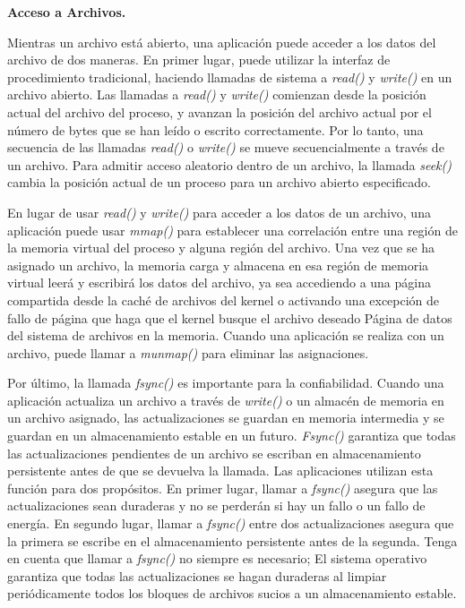 \documentclass[10pt]{book}
\begin{document}
\textbf{Acceso a Archivos.}

Mientras un archivo está abierto, una aplicación puede acceder a los datos del archivo de dos maneras. En primer lugar, puede utilizar la interfaz de procedimiento tradicional, haciendo llamadas de sistema a \textit{read()} y \textit{write()} en un archivo abierto. Las llamadas a \textit{read()} y \textit{write()} comienzan desde la posición actual del archivo del proceso, y avanzan la posición del archivo actual por el número de bytes que se han leído o escrito correctamente. Por lo tanto, una secuencia de las llamadas \textit{read()} o \textit{write()} se mueve secuencialmente a través de un archivo. Para admitir acceso aleatorio dentro de un archivo, la llamada \textit{seek()} cambia la posición actual de un proceso para un archivo abierto especificado.

En lugar de usar \textit{read()} y \textit{write()} para acceder a los datos de un archivo, una aplicación puede usar \textit{mmap()} para establecer una correlación entre una región de la memoria virtual del proceso y alguna región del archivo. Una vez que se ha asignado un archivo, la memoria carga y almacena en esa región de memoria virtual leerá y escribirá los datos del archivo, ya sea accediendo a una página compartida desde la caché de archivos del kernel o activando una excepción de fallo de página que haga que el kernel busque el archivo deseado Página de datos del sistema de archivos en la memoria. Cuando una aplicación se realiza con un archivo, puede llamar a \textit{munmap()} para eliminar las asignaciones.

Por último, la llamada \textit{fsync()} es importante para la confiabilidad. Cuando una aplicación actualiza un archivo a través de \textit{write()} o un almacén de memoria en un archivo asignado, las actualizaciones se guardan en memoria intermedia y se guardan en un almacenamiento estable en un futuro. \textit{Fsync()} garantiza que todas las actualizaciones pendientes de un archivo se escriban en almacenamiento persistente antes de que se devuelva la llamada. Las aplicaciones utilizan esta función para dos propósitos. En primer lugar, llamar a \textit{fsync()} asegura que las actualizaciones sean duraderas y no se perderán si hay un fallo o un fallo de energía. En segundo lugar, llamar a \textit{fsync()} entre dos actualizaciones asegura que la primera se escribe en el almacenamiento persistente antes de la segunda. Tenga en cuenta que llamar a \textit{fsync()} no siempre es necesario; El sistema operativo garantiza que todas las actualizaciones se hagan duraderas al limpiar periódicamente todos los bloques de archivos sucios a un almacenamiento estable.
\end{document}
